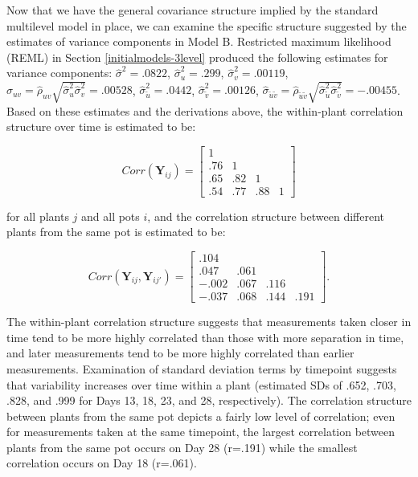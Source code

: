 \documentclass[
]{krantz}
\begin{document}
Now that we have the general covariance structure implied by the standard multilevel model in place, we can examine the specific structure suggested by the estimates of variance components in Model B. Restricted maximum likelihood (REML) in Section \ref{initialmodels-3level} produced the following estimates for variance components: \(\hat{\sigma}^2=.0822\), \(\hat{\sigma}_{u}^{2}=.299\), \(\hat{\sigma}_{v}^{2}=.00119\), \(\hat{\sigma}_{uv}=\hat{\rho}_{uv}\sqrt{\hat{\sigma}_{u}^{2}\hat{\sigma}_{v}^{2}}=.00528\), \(\hat{\sigma}_{\tilde{u}}^{2}=.0442\), \(\hat{\sigma}_{\tilde{v}}^{2}=.00126\), \(\hat{\sigma}_{\tilde{u}\tilde{v}}=\hat{\rho}_{\tilde{u}\tilde{v}}\sqrt{\hat{\sigma}_{\tilde{u}}^{2}\hat{\sigma}_{\tilde{v}}^{2}}=-.00455\). Based on these estimates and the derivations above, the within-plant correlation structure over time is estimated to be:

\[  Corr(\textbf{Y}_{ij}) = \left[
          \begin{array}{cccc}
            1 & & & \\
            .76 & 1 & & \\
            .65 & .82 & 1 & \\
            .54 & .77 & .88 & 1
          \end{array} \right] \]

for all plants \(j\) and all pots \(i\), and the correlation structure between different plants from the same pot is estimated to be:

\[  Corr(\textbf{Y}_{ij},\textbf{Y}_{ij'}) = \left[
          \begin{array}{cccc}
            .104 & & & \\
            .047 & .061 & & \\
            -.002 & .067 & .116 & \\
            -.037 & .068 & .144 & .191
          \end{array} \right]. \]

The within-plant correlation structure suggests that measurements taken closer in time tend to be more highly correlated than those with more separation in time, and later measurements tend to be more highly correlated than earlier measurements. Examination of standard deviation terms by timepoint suggests that variability increases over time within a plant (estimated SDs of .652, .703, .828, and .999 for Days 13, 18, 23, and 28, respectively). The correlation structure between plants from the same pot depicts a fairly low level of correlation; even for measurements taken at the same timepoint, the largest correlation between plants from the same pot occurs on Day 28 (r=.191) while the smallest correlation occurs on Day 18 (r=.061).
\end{document}
